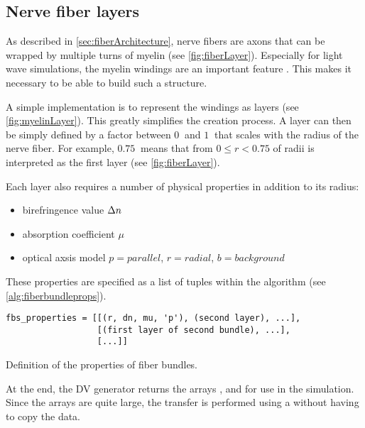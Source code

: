 \subsection{Nerve fiber layers}
%
As described in \cref{sec:fiberArchitecture}, nerve fibers are axons that can be wrapped by multiple turns of myelin (see \cref{fig:fiberLayer}).
Especially for light wave simulations, the myelin windings are an important feature \cite{MenzelDissertation}.
This makes it necessary to be able to build such a structure.
\par
%
A simple implementation is to represent the windings as layers (see \cref{fig:myelinLayer}).
This greatly simplifies the creation process.
A layer can then be simply defined by a factor between $\SI{0}{}$ and $\SI{1}{}$ that scales with the radius of the nerve fiber.
For example, $\SI{0.75}{}$ means that from $0 \leq r < 0.75$ of radii is interpreted as the first layer (see \cref{fig:fiberLayer}).
\par
%
Each layer also requires a number of physical properties in addition to its radius:
%
\begin{itemize}[nosep]
    \item birefringence value $\textnormal{$\Delta n$}$
    \item absorption coefficient $\mu$
    \item optical axsis model $p=\mathit{parallel}$, $r=\mathit{radial}$, $b=\mathit{background}$
\end{itemize}
%
These properties are specified as a list of tuples within the algorithm (see \cref{alg:fiberbundleprops}).
%
\begin{lstfloat}[!ht]
\lstset{style=python}
\begin{lstlisting}[]
fbs_properties = [[(r, dn, mu, 'p'), (second layer), ...],
                  [(first layer of second bundle), ...],
                  [...]]
\end{lstlisting}
\caption{Definition of the properties of fiber bundles.}
\label{alg:fiberbundleprops}
\end{lstfloat}
%
At the end, the DV generator returns the arrays \tissue{}, \opticalaxis{} and \propertylist{} for use in the simulation.
Since the arrays are quite large, the transfer is performed using a  without having to copy the data.
% 
% 
%
